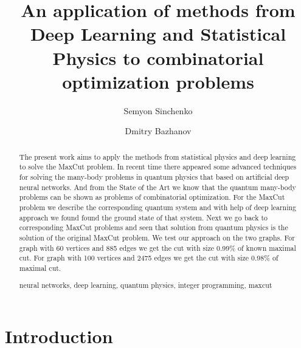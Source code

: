 \documentclass{article}
\newcommand{\keywords}[1]{\par\addvspace\baselineskip
\noindent\keywordname\enspace\ignorespaces#1}
\begin{document}
\mainmatter


\title{An application of methods from Deep Learning and Statistical Physics to combinatorial optimization problems}



\author{Semyon Sinchenko \and Dmitry Bazhanov}




\maketitle


\begin{abstract}
The present work aims to apply the methods from statistical physics and deep learning to solve the MaxCut problem. In recent time there appeared some advanced techniques for solving the many-body problems in quantum physics that based on artificial deep neural networks. And from the State of the Art we know that the quantum many-body problems can be shown as problems of combinatorial optimization. For the MaxCut problem we describe the corresponding quantum system and with help of deep learning approach we found found the ground state of that system. Next we go back to corresponding MaxCut problems and seen that solution from quantum physics is the solution of the original MaxCut problem. We test our approach on the two graphs. For graph with 60 vertices and 885 edges we get the cut with size 0.99\% of known maximal cut. For graph with 100 vertices and 2475 edges we get the cut with size 0.98\% of maximal cut.
\keywords{neural networks, deep learning, quantum physics, integer programming, maxcut}
\end{abstract}

\section{Introduction}
\end{document}
